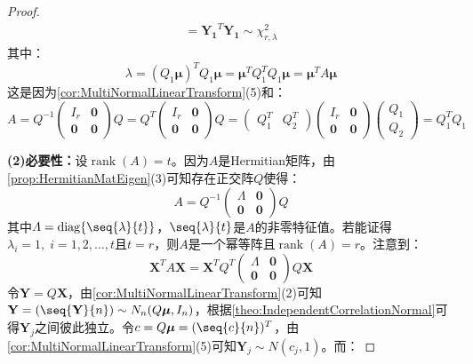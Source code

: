 \begin{proof}
\begin{align*}
		=\mathbf{Y_1}^T\mathbf{Y_1}\sim\chi_{r,\lambda}^2
	\end{align*}
	其中：
	\begin{equation*}
		\lambda=(Q_1\boldsymbol{\mu})^TQ_1\boldsymbol{\mu}=\boldsymbol{\mu}^TQ_1^TQ_1\boldsymbol{\mu}=\boldsymbol{\mu}^TA\boldsymbol{\mu}
	\end{equation*}
	这是因为\cref{cor:MultiNormalLinearTransform}(5)和：
	\begin{equation*}
		A=Q^{-1}
		\begin{pmatrix}
			I_r & \mathbf{0} \\
			\mathbf{0} & \mathbf{0}
		\end{pmatrix}Q
		=Q^T
		\begin{pmatrix}
			I_r & \mathbf{0} \\
			\mathbf{0} & \mathbf{0}
		\end{pmatrix}Q
		=
		\begin{pmatrix}
			Q_1^T & Q_2^T
		\end{pmatrix}
			\begin{pmatrix}
			I_r & \mathbf{0} \\
			\mathbf{0} & \mathbf{0}
		\end{pmatrix}
		\begin{pmatrix}
			Q_1 \\
			Q_2
		\end{pmatrix}
		=Q_1^TQ_1
	\end{equation*}\par
	\textbf{(2)必要性：}设$\operatorname{rank}(A)=t$。因为$A$是Hermitian矩阵，由\cref{prop:HermitianMatEigen}(3)可知存在正交阵$Q$使得：
	\begin{equation*}
		A=Q^{-1}
		\begin{pmatrix}
			\varLambda & \mathbf{0} \\
			\mathbf{0} & \mathbf{0}
		\end{pmatrix}
		Q
	\end{equation*}
	其中$\varLambda=\operatorname{diag}\{\seq{\lambda}{t}\}$，$\seq{\lambda}{t}$是$A$的非零特征值。若能证得$\lambda_i=1,\;i=1,2,\dots,t$且$t=r$，则$A$是一个幂等阵且$\operatorname{rank}(A)=r$。注意到：
	\begin{equation*}
		\mathbf{X}^TA\mathbf{X}=\mathbf{X}^TQ^T
		\begin{pmatrix}
			\varLambda & \mathbf{0} \\
			\mathbf{0} & \mathbf{0}
		\end{pmatrix}
		Q\mathbf{X}
	\end{equation*}
	令$\mathbf{Y}=Q\mathbf{X}$，由\cref{cor:MultiNormalLinearTransform}(2)可知$\mathbf{Y}=(\seq{\mathbf{Y}}{n})\sim N_n(Q\boldsymbol{\mu},I_n)$，根据\cref{theo:IndependentCorrelationNormal}可得$\mathbf{Y}_j$之间彼此独立。令$c=Q\boldsymbol{\mu}=(\seq{c}{n})^T$，由\cref{cor:MultiNormalLinearTransform}(5)可知$\mathbf{Y}_j\sim N(c_j,1)$。而：

\end{proof}
